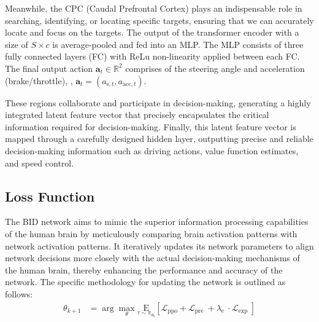Meanwhile, the CPC (Caudal Prefrontal Cortex) plays an indispensable role in searching, identifying, or locating specific targets, ensuring that we can accurately locate and focus on the targets. 
The output of the transformer encoder with a size of $S\times c$ is average-pooled and fed into an MLP. 
The MLP consists of three fully connected layers (FC) with ReLu non-linearity applied between each FC. 
The final output action $\mathbf{a}_t\in\mathbb{R}^2$ comprises of the steering angle and acceleration (brake/throttle), {\ie}, $\mathbf{a}_{t} = (a_{\text{s},t}, a_{\text{acc}, t})$. 


These regions collaborate and participate in decision-making, generating a highly integrated latent feature vector that precisely encapsulates the critical information required for decision-making. 
Finally, this latent feature vector is mapped through a carefully designed hidden layer, outputting precise and reliable decision-making information such as driving actions, value function estimates, and speed control.


\subsection{Loss Function}
The BID network aims to mimic the superior information processing capabilities of the human brain by meticulously comparing brain activation patterns with network activation patterns. 
It iteratively updates its network parameters to align network decisions more closely with the actual decision-making mechanisms of the human brain, thereby enhancing the performance and accuracy of the network. 
The specific methodology for updating the network is outlined as follows:
\begin{align}
	\theta_{k+1} & = \arg \max _{\theta} \underset{\tau \sim \pi_{\theta_{k}}}{\mathrm{E}}\left[\mathcal{L}_{\mathrm{ppo}}+\mathcal{L}_{\text {pre }}+\lambda_{\text {e }} \cdot \mathcal{L}_{\text {exp }}\right]
\end{align}



